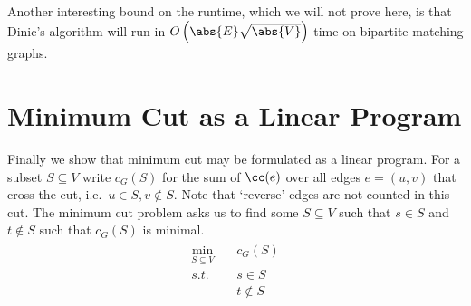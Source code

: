 Another interesting bound on the runtime, which we will not prove here, is that Dinic's algorithm will run in
$O\left(\abs{E}\sqrt{\abs{V}}\right)$ time on bipartite matching graphs.

\section{Minimum Cut as a Linear Program}
Finally we show that minimum cut may be formulated as a linear program. For a subset $S \subseteq V$ write
$c_G(S)$ for the sum of $\cc(e)$ over all edges $e = (u, v)$ that cross the cut, i.e.\ $u \in S, v\not\in S$.
Note that `reverse' edges are not counted in this cut. The minimum cut problem asks us to find some $S\subseteq V$
such that $s\in S$ and $t\not\in S$ such that $c_G(S)$ is minimal.
\begin{align}
  \begin{aligned}
    \min_{S\subseteq V} \quad &c_G(S) \\
    s.t.\quad & s \in S \\
    &t\not\in S\\
  \end{aligned}
  \label{prog0}
\end{align}

